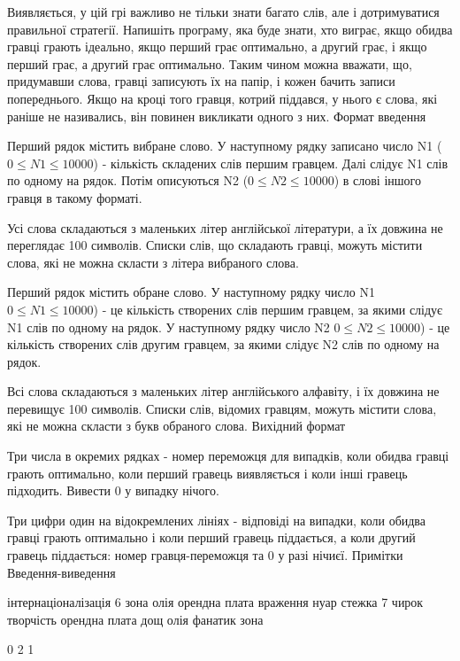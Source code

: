 \documentclass[]{article}
\begin{document}
Виявляється, у цій грі важливо не тільки знати багато слів, але і дотримуватися правильної стратегії. Напишіть програму, яка буде знати, хто виграє, якщо обидва гравці грають ідеально, якщо перший грає оптимально, а другий грає, і якщо перший грає, а другий грає оптимально. Таким чином можна вважати, що, придумавши слова, гравці записують їх на папір, і кожен бачить записи попереднього. Якщо на кроці того гравця, котрий піддався, у нього є слова, які раніше не називались, він повинен викликати одного з них.
Формат введення

Перший рядок містить вибране слово. У наступному рядку записано число N1 ($0 \le N1 \le 10000$) - кількість складених слів першим гравцем. Далі слідує N1 слів по одному на рядок. Потім описуються N2 ($0 \le N2 \le 10000$) в слові іншого гравця в такому форматі.

Усі слова складаються з маленьких літер англійської літератури, а їх довжина не переглядає 100 символів. Списки слів, що складають гравці, можуть містити слова, які не можна скласти з літера вибраного слова.

Перший рядок містить обране слово. У наступному рядку число N1 $0 \le N1 \le 10000$) - це кількість створених слів першим гравцем, за якими слідує N1 слів по одному на рядок. У наступному рядку число N2 $0 \le N2 \le 10000$) - це кількість створених слів другим гравцем, за якими слідує N2 слів по одному на рядок.

Всі слова складаються з маленьких літер англійського алфавіту, і їх довжина не перевищує 100 символів. Списки слів, відомих гравцям, можуть містити слова, які не можна скласти з букв обраного слова.
Вихідний формат

Три числа в окремих рядках - номер переможця для випадків, коли обидва гравці грають оптимально, коли перший гравець виявляється і коли інші гравець підходить. Вивести 0 у випадку нічого.

Три цифри один на відокремлених лініях - відповіді на випадки, коли обидва гравці грають оптимально і коли перший гравець піддається, а коли другий гравець піддається: номер гравця-переможця та 0 у разі нічиєї.
Примітки
Введення-виведення

інтернаціоналізація
6
зона
олія
орендна плата
враження
нуар
стежка
7
чирок
творчість
орендна плата
дощ
олія
фанатик
зона



0
2
1
\end{document}
